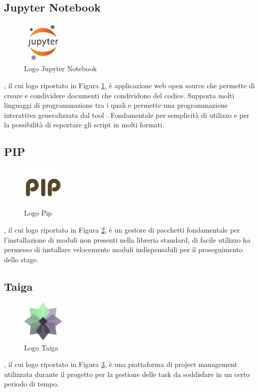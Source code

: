 \subsection{Jupyter Notebook}
\begin{figure}[H]
	\begin{center} \includegraphics[width=2cm]{figures/jupyter}
		\caption[Logo Jupyter Notebook]{Logo Jupyter Notebook}
		\label{logo_jupyter} 
	\end{center}
\end{figure}
, il cui logo riportato in Figura \ref{logo_jupyter}, è applicazione web open source che permette di creare e condividere documenti che condividono del codice. Supporta molti linguaggi di programmazione tra i quali  e permette una programmazione interattiva generalizzata dal tool . Fondamentale per semplicità di utilizzo e per la possibilità di esportare gli script in molti formati.

\subsection{PIP}
\begin{figure}[H]
	\begin{center} \includegraphics[width=2cm]{figures/pip}
		\caption[Logo Pip]{Logo Pip}
		\label{logo_pip} 
	\end{center}
\end{figure}
, il cui logo riportato in Figura \ref{logo_pip}, è un gestore di pacchetti  fondamentale per l'installazione di moduli non presenti nella libreria standard, di facile utilizzo ha permesso di installare velocemente moduli indispensabili per il proseguimento dello stage.

\subsection{Taiga}
\begin{figure}[H]
	\begin{center} \includegraphics[width=2cm]{figures/taiga}
		\caption[Logo Taiga]{Logo Taiga}
		\label{logo_taiga} 
	\end{center}
\end{figure}
, il cui logo riportato in Figura \ref{logo_taiga}, è una piattaforma di project management utilizzata durante il progetto per la gestione delle task da soddisfare in un certo periodo di tempo.